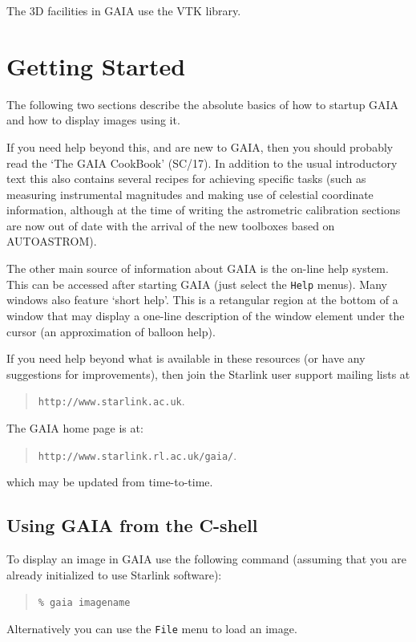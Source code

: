 \documentclass[twoside,11pt]{article}
\newcommand{\htmladdnormallink}[2]{#1}
\newcommand{\xref}[3]{#1}
\newcommand{\xlabel}[1]{}
\renewcommand{\_}{\texttt{\symbol{95}}}
\newcommand{\mytt}[1]{{\texttt{#1}}}
\begin{document}
The 3D facilities in GAIA use the
\htmladdnormallink{VTK}{http://www.kitware.com} library.

\section{\xlabel{getting_started}Getting Started}

The following two sections describe the absolute basics of how to
startup GAIA and how to display images using it.

If you need help beyond this, and are new to GAIA, then you should probably
read the `The GAIA CookBook' (\xref{SC/17}{sc17}{}). In addition to the usual
introductory text this also contains several recipes for achieving specific
tasks (such as measuring instrumental magnitudes and making use of celestial
coordinate information, although at the time of writing the astrometric
calibration sections are now out of date with the arrival of the new toolboxes
based on AUTOASTROM).

The other main source of information about GAIA is the 
\xref{on-line help system}{gaia}{regions}. 
This can be accessed after starting GAIA (just select the
\mytt{Help} menus). Many windows also feature `short help'. This is a
retangular region at the bottom of a window that may display a
one-line description of the window element under the cursor (an
approximation of balloon help).

If you need help beyond what is available in these resources (or have
any suggestions for improvements), then join the Starlink user support
mailing lists at
\begin{quote}
\htmladdnormallink{\mytt{http://www.starlink.ac.uk}}{http://www.starlink.ac.uk}.
\end{quote}
The GAIA home page is at:
\begin{quote}
\htmladdnormallink{\mytt{http://www.starlink.rl.ac.uk/gaia/}}{http://www.starlink.rl.ac.uk/gaia/}.
\end{quote}
which may be updated from time-to-time. 

\subsection{\xlabel{using_gaia_from_the_cshell}Using GAIA from the C-shell}

To display an image in GAIA use the following command
(assuming that you are already initialized to use Starlink software):
\begin{quote}
\mytt{\% gaia image\_name}
\end{quote}
Alternatively you can use the \mytt{File} menu to load an image.
\end{document}
